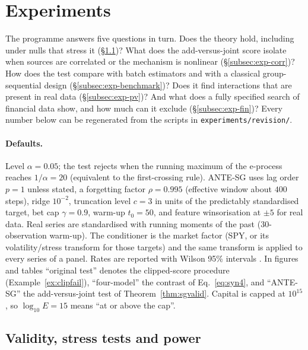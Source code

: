 \documentclass[pdflatex,sn-mathphys-ay]{sn-jnl}%
\theoremstyle{thmstyleone}%
\theoremstyle{thmstyletwo}%
\theoremstyle{thmstylethree}%
\begin{document}
\section{Experiments}\label{sec:experiments}

The programme answers five questions in turn. Does the theory hold, including under
nulls that stress it (\S\ref{subsec:exp-validity})? What does the add-versus-joint score isolate when
sources are correlated or the mechanism is nonlinear (\S\ref{subsec:exp-corr})? How does the
test compare with batch estimators and with a classical group-sequential design
(\S\ref{subsec:exp-benchmark})? Does it find interactions that are present in real data
(\S\ref{subsec:exp-pv})? And what does a fully specified search of financial data show, and how
much can it exclude (\S\ref{subsec:exp-fin})? Every number below can be regenerated from the scripts
in \texttt{experiments/revision/}.

\paragraph{Defaults.} Level $\alpha=0.05$; the test rejects when the running maximum of the e-process
reaches $1/\alpha=20$ (equivalent to the first-crossing rule). ANTE-SG uses lag order $p=1$ unless
stated, a forgetting factor $\rho=0.995$ (effective window about $400$ steps), ridge $10^{-2}$, truncation
level $c=3$ in units of the predictably standardised target, bet cap $\gamma=0.9$, warm-up $t_0=50$,
and feature winsorisation at $\pm5$ for real data. Real series are standardised with running moments of the
past (30-observation warm-up). The conditioner is the market factor
(SPY, or its volatility/stress transform for those targets) and the same transform is applied to every
series of a panel. Rates are reported with Wilson 95\% intervals \citep{wilson1927}. In figures and
tables ``original test'' denotes the clipped-score procedure (Example~\ref{ex:clipfail}), ``four-model''
the contrast of Eq.~\eqref{eq:syn4}, and ``ANTE-SG'' the add-versus-joint test of
Theorem~\ref{thm:sgvalid}. Capital is capped at $10^{15}$, so $\log_{10}E=15$ means ``at or above the cap''.

\subsection{Validity, stress tests and power}\label{subsec:exp-validity}
\end{document}

